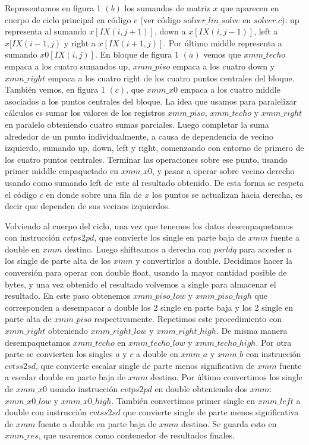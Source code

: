 \par Representamos en figura 1 $(b)$ los sumandos de matriz $x$ que aparecen en cuerpo de ciclo principal en código $c$ (ver código $solver\_lin\_solve$ en $solver.c$): up representa al sumando $x[IX(i,j+1)]$, down a $x[IX(i,j-1)]$, left a $x[IX(i-1,j)$ y right a $x[IX(i+1,j)]$. Por último middle representa a sumando $x0[IX(i,j)]$. En bloque de figura 1 $(a)$ vemos que $xmm\_techo$ empaca a los cuatro sumandos up, $xmm\_piso$ empaca a los cuatro down y $xmm\_right$ empaca a los cuatro right de los cuatro puntos centrales del bloque. También vemos, en figura 1 $(c)$, que $xmm\_x0$ empaca a los cuatro middle asociados a los puntos centrales del bloque. La idea que usamos para paralelizar cálculos es sumar los valores de los registros $xmm\_piso$, $xmm\_techo$ y $xmm\_right$ en paralelo obteniendo cuatro sumas parciales. Luego completar la suma alrededor de un punto individualmente, a causa de dependencia de vecino izquierdo, sumando up, down, left y right, comenzando con entorno de primero de los cuatro puntos centrales. Terminar las operaciones sobre ese punto, usando primer middle empaquetado en $xmm\_x0$, y pasar a operar sobre vecino derecho usando como sumando left de este al resultado obtenido. De esta forma se respeta el código $c$ en donde sobre una fila de $x$ los puntos se actualizan hacia derecha, es decir que dependen de sus vecinos izquierdos.\newline
  
\par Volviendo al cuerpo del ciclo, una vez que tenemos los datos desempaquetamos con instrucción $cvtps2pd$, que convierte los single en parte baja de $xmm$ fuente a double en $xmm$ destino. Luego shifteamos a derecha con $psrldq$ para acceder a los single de parte alta de los $xmm$ y convertirlos a double. Decidimos hacer la conversión para operar con double float, usando la mayor cantidad posible de bytes, y una vez obtenido el resultado volvemos a single para almacenar el resultado. En este paso obtenemos $xmm\_piso\_low$ y $xmm\_piso\_high$ que corresponden a desempacar a double los 2 single en parte baja y los 2 single en parte alta de $xmm\_piso$ respectivamente. Repetimos este procedimiento con $xmm\_right$ obteniendo $xmm\_right\_low$ y $xmm\_right\_high$. De misma manera desempaquetamos $xmm\_techo$ en $xmm\_techo\_low$ y $xmm\_techo\_high$. Por otra parte se convierten los singles $a$ y $c$ a double en $xmm\_a$ y $xmm\_b$ con instrucción $cvtss2sd$, que convierte escalar single de parte menos significativa de $xmm$ fuente a escalar double en parte baja de $xmm$ destino. Por último convertimos los single de $xmm\_x0$ usando instrucción $cvtps2pd$ en double obteniendo dos $xmm$: $xmm\_x0\_low$ y $xmm\_x0\_high$. También convertimos primer single en $xmm\_left$ a double con instrucción $cvtss2sd$ que convierte single de parte menos significativa de $xmm$ fuente a double en parte baja de $xmm$ destino. Se guarda esto en $xmm\_res$, que usaremos como contenedor de resultados finales.\newline

